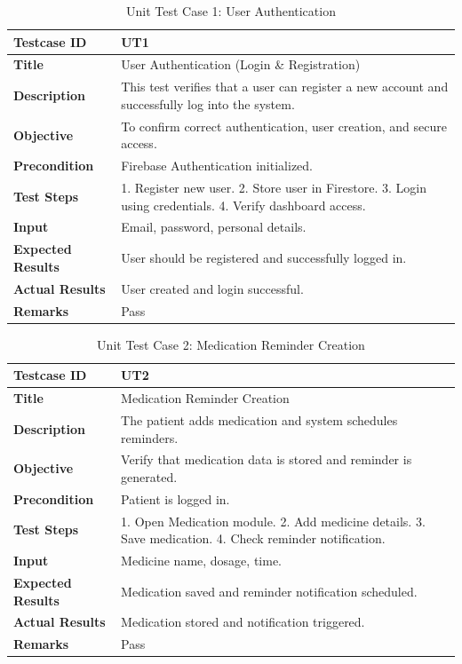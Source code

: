\documentclass[12pt, a4paper, oneside]{report}
\begin{document}
\begin{table}[H]
\centering
\caption{Unit Test Case 1: User Authentication}
\begin{tabularx}{\textwidth}{|l|X|}
\hline
\textbf{Testcase ID} & UT1 \\ \hline
\textbf{Title} & User Authentication (Login \& Registration) \\ \hline
\textbf{Description} & This test verifies that a user can register a new account and successfully log into the system. \\ \hline
\textbf{Objective} & To confirm correct authentication, user creation, and secure access. \\ \hline
\textbf{Precondition} & Firebase Authentication initialized. \\ \hline
\textbf{Test Steps} & 1. Register new user. 2. Store user in Firestore. 3. Login using credentials. 4. Verify dashboard access. \\ \hline
\textbf{Input} & Email, password, personal details. \\ \hline
\textbf{Expected Results} & User should be registered and successfully logged in. \\ \hline
\textbf{Actual Results} & User created and login successful. \\ \hline
\textbf{Remarks} & Pass \\ \hline
\end{tabularx}
\end{table}

\begin{table}[H]
\centering
\caption{Unit Test Case 2: Medication Reminder Creation}
\begin{tabularx}{\textwidth}{|l|X|}
\hline
\textbf{Testcase ID} & UT2 \\ \hline
\textbf{Title} & Medication Reminder Creation \\ \hline
\textbf{Description} & The patient adds medication and system schedules reminders. \\ \hline
\textbf{Objective} & Verify that medication data is stored and reminder is generated. \\ \hline
\textbf{Precondition} & Patient is logged in. \\ \hline
\textbf{Test Steps} & 1. Open Medication module. 2. Add medicine details. 3. Save medication. 4. Check reminder notification. \\ \hline
\textbf{Input} & Medicine name, dosage, time. \\ \hline
\textbf{Expected Results} & Medication saved and reminder notification scheduled. \\ \hline
\textbf{Actual Results} & Medication stored and notification triggered. \\ \hline
\textbf{Remarks} & Pass \\ \hline
\end{tabularx}
\end{table}
\end{document}
